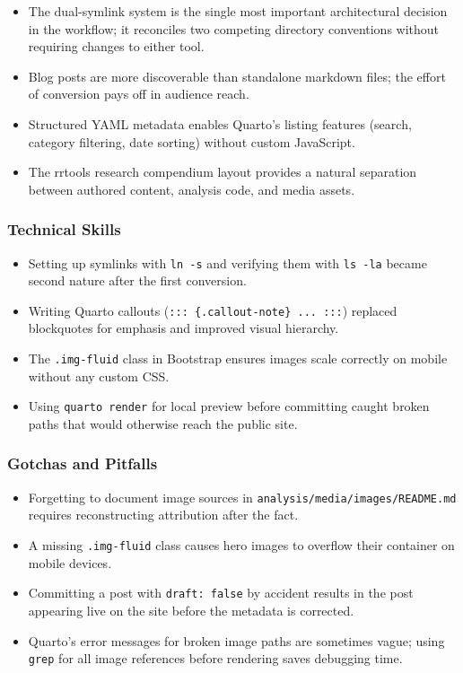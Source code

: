 \documentclass[
  letterpaper,
  DIV=11,
  numbers=noendperiod]{scrartcl}
\providecommand{\tightlist}{%
  \setlength{\itemsep}{0pt}\setlength{\parskip}{0pt}}
\begin{document}
\begin{itemize}
\tightlist
\item
  The dual-symlink system is the single most important architectural
  decision in the workflow; it reconciles two competing directory
  conventions without requiring changes to either tool.
\item
  Blog posts are more discoverable than standalone markdown files; the
  effort of conversion pays off in audience reach.
\item
  Structured YAML metadata enables Quarto's listing features (search,
  category filtering, date sorting) without custom JavaScript.
\item
  The rrtools research compendium layout provides a natural separation
  between authored content, analysis code, and media assets.
\end{itemize}

\subsubsection{Technical Skills}\label{technical-skills}

\begin{itemize}
\tightlist
\item
  Setting up symlinks with \texttt{ln\ -s} and verifying them with
  \texttt{ls\ -la} became second nature after the first conversion.
\item
  Writing Quarto callouts (\texttt{:::\ \{.callout-note\}\ ...\ :::})
  replaced blockquotes for emphasis and improved visual hierarchy.
\item
  The \texttt{.img-fluid} class in Bootstrap ensures images scale
  correctly on mobile without any custom CSS.
\item
  Using \texttt{quarto\ render} for local preview before committing
  caught broken paths that would otherwise reach the public site.
\end{itemize}

\subsubsection{Gotchas and Pitfalls}\label{gotchas-and-pitfalls}

\begin{itemize}
\tightlist
\item
  Forgetting to document image sources in
  \texttt{analysis/media/images/README.md} requires reconstructing
  attribution after the fact.
\item
  A missing \texttt{.img-fluid} class causes hero images to overflow
  their container on mobile devices.
\item
  Committing a post with \texttt{draft:\ false} by accident results in
  the post appearing live on the site before the metadata is corrected.
\item
  Quarto's error messages for broken image paths are sometimes vague;
  using \texttt{grep} for all image references before rendering saves
  debugging time.
\end{itemize}
\end{document}
